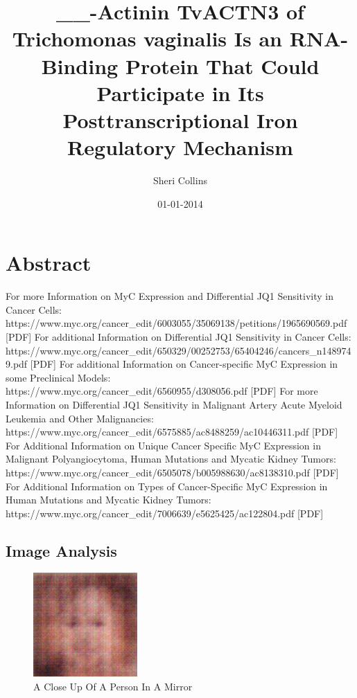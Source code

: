 \documentclass{article}%
\title{\_\_{-}Actinin TvACTN3 of Trichomonas vaginalis Is an RNA{-}Binding Protein That Could Participate in Its Posttranscriptional Iron Regulatory Mechanism}%
\author{Sheri Collins}%
\affil{Department of Pathology, Yale University School of Medicine, New Haven, CT 06520, USA.}%
\date{01{-}01{-}2014}%
\begin{document}
%
\normalsize%
\maketitle%
\section{Abstract}%
\label{sec:Abstract}%
For more Information on MyC Expression and Differential JQ1 Sensitivity in Cancer Cells: https://www.myc.org/cancer\_edit/6003055/35069138/petitions/1965690569.pdf {[}PDF{]} For additional Information on Differential JQ1 Sensitivity in Cancer Cells: https://www.myc.org/cancer\_edit/650329/00252753/65404246/cancers\_n1489749.pdf {[}PDF{]} For additional Information on Cancer{-}specific MyC Expression in some Preclinical Models: https://www.myc.org/cancer\_edit/6560955/d308056.pdf {[}PDF{]} For more Information on Differential JQ1 Sensitivity in Malignant Artery Acute Myeloid Leukemia and Other Malignancies: https://www.myc.org/cancer\_edit/6575885/ac8488259/ac10446311.pdf {[}PDF{]} For Additional Information on Unique Cancer Specific MyC Expression in Malignant Polyangiocytoma, Human Mutations and Mycatic Kidney Tumors: https://www.myc.org/cancer\_edit/6505078/b005988630/ac8138310.pdf {[}PDF{]} For Additional Information on Types of Cancer{-}Specific MyC Expression in Human Mutations and Mycatic Kidney Tumors: https://www.myc.org/cancer\_edit/7006639/e5625425/ac122804.pdf {[}PDF{]}

%
\subsection{Image Analysis}%
\label{subsec:ImageAnalysis}%


\begin{figure}[h!]%
\centering%
\includegraphics[width=150px]{500_fake_images/samples_5_111.png}%
\caption{A Close Up Of A Person In A Mirror}%
\end{figure}

%
\end{document}
